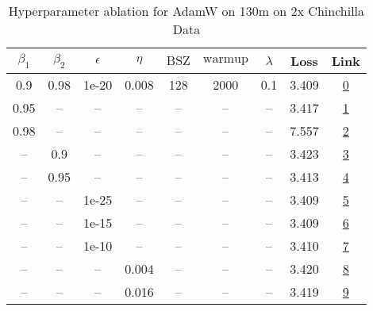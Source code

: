 \begin{table}[H]
\centering
\caption{Hyperparameter ablation for AdamW on 130m on 2x Chinchilla Data}
\label{tab:ablation_adamw_130m_2}
\begin{tabular}{ccccccccc}
\toprule
$\beta_1$ & $\beta_2$ & $\epsilon$ & $\eta$ & $\mathrm{BSZ}$ & $\mathrm{warmup}$ & $\lambda$ & Loss & Link \\
\midrule
0.9 & 0.98 & 1e-20 & 0.008 & 128 & 2000 & 0.1 & 3.409 & \href{https://wandb.ai/stanford-mercury/optimizer-scaling/runs/sweep-130m-5B-adamw90f5c1lr0.008-wd0.1-minlr0-warmup2000-b10.9-b-67adb6}{0} \\
\midrule
0.95 & -- & -- & -- & -- & -- & -- & 3.417 & \href{https://wandb.ai/stanford-mercury/optimizer-scaling/runs/sweep-130m-5B-adamw995582lr0.008-wd0.1-minlr0-warmup2000-b10.95--0fb321}{1} \\
0.98 & -- & -- & -- & -- & -- & -- & 7.557 & \href{https://wandb.ai/stanford-mercury/optimizer-scaling/runs/sweep-130m-5B-adamw220e11lr0.008-wd0.1-minlr0-warmup2000-b10.98--f8f851}{2} \\
-- & 0.9 & -- & -- & -- & -- & -- & 3.423 & \href{https://wandb.ai/stanford-mercury/optimizer-scaling/runs/sweep-130m-5B-adamw757bfblr0.008-wd0.1-minlr0-warmup2000-b10.9-b-da391a}{3} \\
-- & 0.95 & -- & -- & -- & -- & -- & 3.413 & \href{https://wandb.ai/stanford-mercury/optimizer-scaling/runs/sweep-130m-5B-adamwc562dclr0.008-wd0.1-minlr0-warmup2000-b10.9-b-9752b5}{4} \\
-- & -- & 1e-25 & -- & -- & -- & -- & 3.409 & \href{https://wandb.ai/stanford-mercury/optimizer-scaling/runs/sweep-130m-5B-adamw0da527lr0.008-wd0.1-minlr0-warmup2000-b10.9-b-9c6463}{5} \\
-- & -- & 1e-15 & -- & -- & -- & -- & 3.409 & \href{https://wandb.ai/stanford-mercury/optimizer-scaling/runs/sweep-130m-5B-adamw4f03a8lr0.008-wd0.1-minlr0-warmup2000-b10.9-b-c453b4}{6} \\
-- & -- & 1e-10 & -- & -- & -- & -- & 3.410 & \href{https://wandb.ai/stanford-mercury/optimizer-scaling/runs/sweep-130m-5B-adamwf4cc20lr0.008-wd0.1-minlr0-warmup2000-b10.9-b-c52587}{7} \\
-- & -- & -- & 0.004 & -- & -- & -- & 3.420 & \href{https://wandb.ai/stanford-mercury/optimizer-scaling/runs/sweep-130m-5B-adamw8cf61clr0.004-wd0.1-minlr0-warmup2000-b10.9-b-481a17}{8} \\
-- & -- & -- & 0.016 & -- & -- & -- & 3.419 & \href{https://wandb.ai/stanford-mercury/optimizer-scaling/runs/sweep-130m-5B-adamw093957lr0.016-wd0.1-minlr0-warmup2000-b10.9-b-d1d1c5}{9} \\

\end{tabular}
\end{table}
